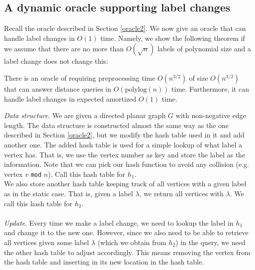 \subsection{A dynamic oracle supporting label changes}\label{oracle4}
Recall the oracle described in Section \ref{oracle2}. We now give an oracle that can
handle label changes in $O(1)$ time. Namely, we show the following theorem if we assume
that there are no more than $O(\sqrt{n})$ labels of polynomial size and a label change
does not change this:
\begin{thm}\label{thm3}
  There is an oracle of requiring preprocessing time $O(n^{3/2})$ of size $O(n^{3/2})$ that
  can answer distance queries in $O(\text{polylog}(n))$ time. Furthermore, it can handle
  label changes in expected amortized $O(1)$ time.
\end{thm}
\textit{Data structure}.
We are given a directed planar graph $G$ with non-negative edge length. The data structure is constructed almost the same way as the one described in Section
\ref{oracle2}, but we modify the hash table used in it and add another one. The added
hash table is used for a simple lookup of what label a vertex has. That is, we use the
vertex number as key and store the label as the information. Note that we can pick our
hash function to avoid any collision (e.g. vertex $v$ \texttt{mod} $n$). Call this hash
table for $h_1$. \\
We also store another hash table keeping track of all vertices with a given label as in
the static case. That is, given a label $\lambda$, we return all vertices with $\lambda$.
We call this hash table for $h_2$. \\
\\
\indent\textit{Update}.
Every time we make a label change, we need to lookup the label in $h_1$ and change
it to the new one. However, since we also need to be able to retrieve all vertices given some label
$\lambda$ (which we obtain from $h_2$) in the query, we need the other hash table to adjust accordingly. This means
removing the vertex from the hash table and inserting in its new location in the hash table.

